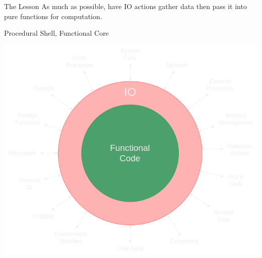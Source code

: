 \documentclass[10pt, presentation, colorlinks]{beamer}
\begin{document}
\begin{frame}[label={sec:org0cce3b5}]{The Lesson}
As much as possible, have IO actions gather data then pass it into
pure functions for computation.
\end{frame}

\begin{frame}[label={sec:orgc13df5a}]{Procedural Shell, Functional Core}
\begin{center}
\includegraphics[height=0.6\textheight]{./img/functional-core.png}
\end{center}
\end{frame}
\end{document}
